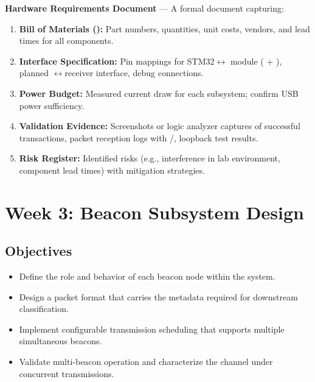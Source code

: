 \documentclass[11pt,letterpaper]{article}
\begin{document}
	\begin{tcolorbox}[deliverable={Week 2 Deliverable}]
		\textbf{Hardware Requirements Document} --- A formal document capturing:
		\begin{enumerate}
			\item \textbf{Bill of Materials (\BOM{}):} Part numbers, quantities, unit costs, vendors, and lead times for all components.
			\item \textbf{Interface Specification:} Pin mappings for STM32$\leftrightarrow$\RF{} module (\SPI{} + \GPIO{}), planned \FPGA{}$\leftrightarrow$receiver interface, \UART{} debug connections.
			\item \textbf{Power Budget:} Measured current draw for each subsystem; confirm USB power sufficiency.
			\item \textbf{Validation Evidence:} Screenshots or logic analyzer captures of successful \SPI{} transactions, packet reception logs with \RSSI{}/\SNR{}, \FPGA{} loopback test results.
			\item \textbf{Risk Register:} Identified risks (e.g., \RF{} interference in lab environment, component lead times) with mitigation strategies.
		\end{enumerate}
	\end{tcolorbox}
	
	\newpage
	\section{Week 3: Beacon Subsystem Design}
	\label{sec:beacon}
	
	\subsection{Objectives}
	
	\begin{itemize}[leftmargin=2em]
		\item Define the role and behavior of each beacon node within the system.
		\item Design a packet format that carries the metadata required for downstream classification.
		\item Implement configurable transmission scheduling that supports multiple simultaneous beacons.
		\item Validate multi-beacon operation and characterize the \RF{} channel under concurrent transmissions.
	\end{itemize}
	
\end{document}
